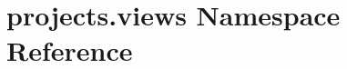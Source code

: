 \hypertarget{namespaceprojects_1_1views}{\section{projects.\-views Namespace Reference}
\label{namespaceprojects_1_1views}
}
